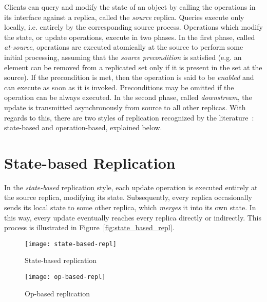 Clients can query and modify the state of an object by calling the operations in
its interface against a replica, called the \textit{source} replica. Queries
execute only locally, i.e. entirely by the corresponding source process.
Operations which modify the state, or update operations, execute in two phases.
In the first phase, called \textit{at-source}, operations are executed
atomically at the source to perform some initial processing, assuming that the
\textit{source precondition} is satisfied (e.g. an element can be removed from a
replicated set only if it is present in the set at the source). If the
precondition is met, then the operation is said to be \textit{enabled} and can
execute as soon as it is invoked. Preconditions may be omitted if the operation
can be always executed. In the second phase, called \textit{downstream}, the
update is transmitted asynchronously from source to all other replicas. With
regards to this, there are two styles of replication recognized by the
literature~\cite{Saito:2005:OR:1057977.1057980}: state-based and
operation-based, explained below.

\section{State-based Replication}
\label{sec:state-based_replication}

In the \textit{state-based} replication style, each update operation is executed
entirely at the source replica, modifying its state. Subsequently, every replica
occasionally sends its local state to some other replica, which \textit{merges}
it into its own state. In this way, every update eventually reaches every
replica directly or indirectly. This process is illustrated in
Figure~\ref{fig:state_based_repl}.

\begin{figure}
  \centering
  \begin{minipage}{0.45\linewidth}
    \centering
    \texttt{[image: state-based-repl]}
    \caption{State-based replication}
    \label{fig:state_based_repl}
  \end{minipage}
  \qquad
  \begin{minipage}{0.45\linewidth}
    \centering
    \texttt{[image: op-based-repl]}
    \caption{Op-based replication}
    \label{fig:op_based_repl}
  \end{minipage}
\end{figure}

